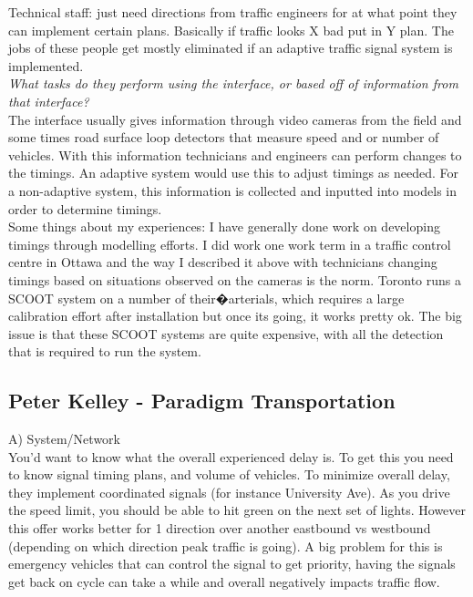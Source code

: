 \documentclass{report}
\begin{document}
Technical staff: just need directions from traffic engineers for at what point they can implement certain plans.
Basically if traffic looks X bad put in Y plan.
The jobs of these people get mostly eliminated if an adaptive traffic signal system is implemented. \\ 

\noindent \emph{What tasks do they perform using the interface, or based off of information from that interface?} \\
The interface usually gives information through video cameras from the field and some times road surface loop detectors that measure speed and or number of vehicles.
With this information technicians and engineers can perform changes to the timings.
An adaptive system would use this to adjust timings as needed.
For a non-adaptive system, this information is collected and inputted into models in order to determine timings. \\

Some things about my experiences:
I have generally done work on developing timings through modelling efforts. I did work one work term in a traffic control centre in Ottawa and the way I described it above with technicians changing timings based on situations observed on the cameras is the norm.
Toronto runs a SCOOT system on a number of their�arterials, which requires a large calibration effort after installation but once its going, it works pretty ok.
The big issue is that these SCOOT systems are quite expensive, with all the detection that is required to run the system.

\subsection{Peter Kelley - Paradigm Transportation}
A) System/Network \\
You'd want to know what the overall experienced delay is.
To get this you need to know signal timing plans, and volume of vehicles.
To minimize overall delay, they implement coordinated signals (for instance University Ave).
As you drive the speed limit, you should be able to hit green on the next set of lights.
However this offer works better for 1 direction over another eastbound vs westbound (depending on which direction peak traffic is going).
A big problem for this is emergency vehicles that can control the signal to get priority, having the signals get back on cycle can take a while and overall negatively impacts traffic flow.
\end{document}
